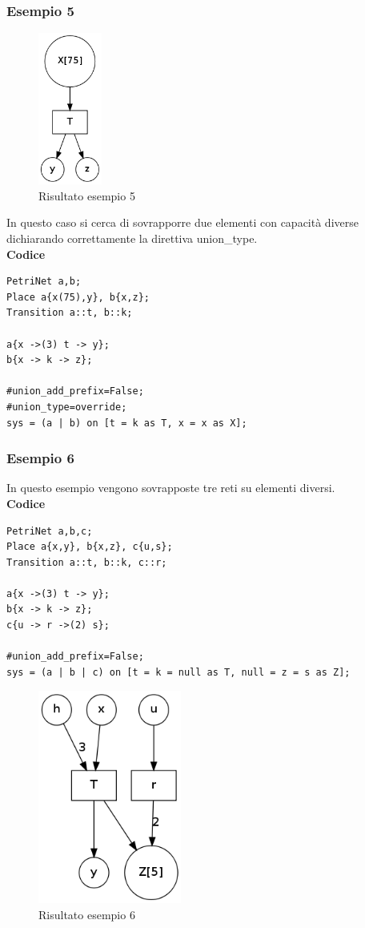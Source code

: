 \documentclass[italian,12pt]{book}
\begin{document}
\subsubsection{Esempio 5}
\begin{figure}[htb]
\centerline{\includegraphics[height=5cm]{img/unione_004.png}}
\caption{Risultato esempio 5}\label{fig:unione_004.png}
\end{figure}
In questo caso si cerca di sovrapporre due elementi con capacità diverse
dichiarando correttamente la direttiva union\_type.\\
{\bf Codice}
\begin{verbatim}
PetriNet a,b;
Place a{x(75),y}, b{x,z};
Transition a::t, b::k;

a{x ->(3) t -> y};
b{x -> k -> z};

#union_add_prefix=False;
#union_type=override;
sys = (a | b) on [t = k as T, x = x as X];
\end{verbatim}

\subsubsection{Esempio 6}

In questo esempio vengono sovrapposte tre reti su elementi diversi.\\
{\bf Codice}
\begin{verbatim}
PetriNet a,b,c;
Place a{x,y}, b{x,z}, c{u,s};
Transition a::t, b::k, c::r;

a{x ->(3) t -> y};
b{x -> k -> z};
c{u -> r ->(2) s};

#union_add_prefix=False;
sys = (a | b | c) on [t = k = null as T, null = z = s as Z];
\end{verbatim}
\begin{figure}[htb]
\centerline{\includegraphics[height=7cm]{img/unione_006.png}}
\caption{Risultato esempio 6}\label{fig:unione_006.png}
\end{figure}
\newpage
\end{document}
